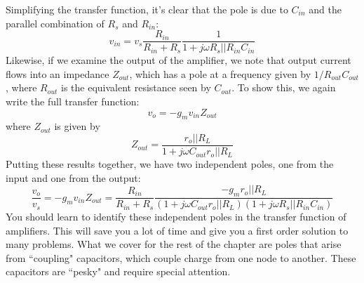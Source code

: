 Simplifying the transfer function, it's clear that the pole is due to $C_{in}$ and the parallel combination of $R_s $ and $R_{in}$:
    \begin{equation}
        v_{in} = v_s \frac{R_{in}}{R_{in} + R_s} \frac{1}{ 1 + j\omega R_s || R_{in} C_{in}} 
    \end{equation}
Likewise, if we examine the output of the amplifier, we note that output current flows into an impedance $Z_{out}$, which has a pole at a frequency given by $1/R_{out}C_{out}$, where $R_{out}$ is the equivalent resistance seen by $C_{out}$.  To show this, we again write the full transfer function:
    \begin{equation}
        v_o = -g_m v_{in} Z_{out} 
    \end{equation}
where $Z_{out}$ is given by
    \begin{equation}
        Z_{out} = \frac{r_o || R_L}{1 + j\omega C_{out} r_o || R_L}
    \end{equation}
Putting these results together, we have two independent poles, one from the input and one from the output:
    \begin{equation}
        \frac{v_o}{v_s} = -g_m v_{in} Z_{out} = \frac{R_{in}}{R_{in} + R_s} \frac{-g_m r_o || R_L}{(1 + j\omega C_{out} r_o || R_L)(1 + j\omega R_s || R_{in} C_{in})}
    \end{equation}
You should learn to identify these independent poles in the transfer function of amplifiers.  This will save you a lot of time and give you a first order solution to many problems.  What we cover for the rest of the chapter are poles that arise from ``coupling" capacitors, which couple charge from one node to another. These capacitors are ``pesky" and require special attention.
